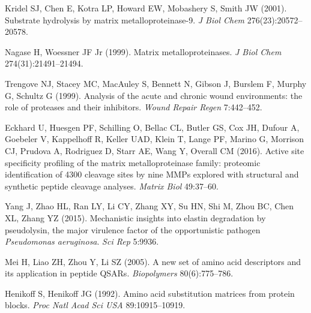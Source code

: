 \documentclass[10pt,a4paper]{article}
\numberwithin{equation}{section}
\begin{document}
\begin{enumerate}[label={[\arabic*]},noitemsep,leftmargin=*]
\item Kridel SJ, Chen E, Kotra LP, Howard EW, Mobashery S, Smith JW (2001).
  Substrate hydrolysis by matrix metalloproteinase-9.
  \textit{J Biol Chem} 276(23):20572--20578.

\item Nagase H, Woessner JF Jr (1999). Matrix metalloproteinases.
  \textit{J Biol Chem} 274(31):21491--21494.

\item Trengove NJ, Stacey MC, MacAuley S, Bennett N, Gibson J, Burslem F,
  Murphy G, Schultz G (1999). Analysis of the acute and chronic wound
  environments: the role of proteases and their inhibitors.
  \textit{Wound Repair Regen} 7:442--452.

\item Eckhard U, Huesgen PF, Schilling O, Bellac CL, Butler GS, Cox JH, Dufour A,
  Goebeler V, Kappelhoff R, Keller UAD, Klein T, Lange PF, Marino G, Morrison CJ,
  Prudova A, Rodriguez D, Starr AE, Wang Y, Overall CM (2016). Active site
  specificity profiling of the matrix metalloproteinase family: proteomic
  identification of 4300 cleavage sites by nine MMPs explored with structural and
  synthetic peptide cleavage analyses. \textit{Matrix Biol} 49:37--60.

\item Yang J, Zhao HL, Ran LY, Li CY, Zhang XY, Su HN, Shi M, Zhou BC, Chen XL,
  Zhang YZ (2015). Mechanistic insights into elastin degradation by pseudolysin,
  the major virulence factor of the opportunistic pathogen \textit{Pseudomonas
  aeruginosa}. \textit{Sci Rep} 5:9936.

\item Mei H, Liao ZH, Zhou Y, Li SZ (2005). A new set of amino acid descriptors
  and its application in peptide QSARs. \textit{Biopolymers} 80(6):775--786.

\item Henikoff S, Henikoff JG (1992). Amino acid substitution matrices from
  protein blocks. \textit{Proc Natl Acad Sci USA} 89:10915--10919.
\end{enumerate}
\end{document}
